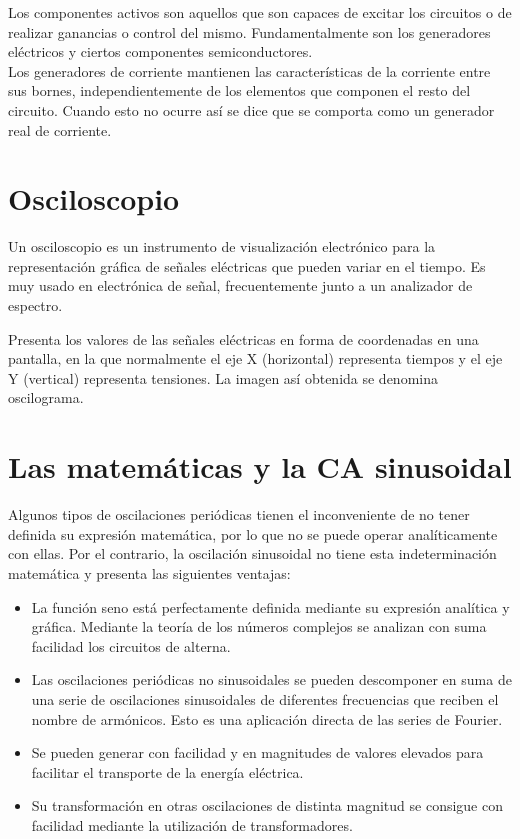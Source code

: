 \documentclass{article}
\begin{document}
  Los componentes activos son aquellos que son capaces de excitar los circuitos o de realizar ganancias o control del mismo. Fundamentalmente son los generadores eléctricos y ciertos componentes semiconductores.\citep{EAP}\\
  
    Los generadores de corriente mantienen las características de la corriente entre sus bornes, independientemente de los elementos que componen el resto del circuito. Cuando esto no ocurre así se dice que se comporta como un generador real de corriente.\citep{EAP}\\

\section{Osciloscopio}

Un osciloscopio es un instrumento de visualización electrónico para la representación gráfica de señales eléctricas que pueden variar en el tiempo. Es muy usado en electrónica de señal, frecuentemente junto a un analizador de espectro.\citep{Osc}

Presenta los valores de las señales eléctricas en forma de coordenadas en una pantalla, en la que normalmente el eje X (horizontal) representa tiempos y el eje Y (vertical) representa tensiones. La imagen así obtenida se denomina oscilograma.\citep{Osc} 

\section{Las matemáticas y la CA sinusoidal}

Algunos tipos de oscilaciones periódicas tienen el inconveniente de no tener definida su expresión matemática, por lo que no se puede operar analíticamente con ellas. Por el contrario, la oscilación sinusoidal no tiene esta indeterminación matemática y presenta las siguientes ventajas:\citep{CA}\\

\begin{itemize}
    \item La función seno está perfectamente definida mediante su expresión analítica y gráfica. Mediante la teoría de los números complejos se analizan con suma facilidad los circuitos de alterna.
    
    \item Las oscilaciones periódicas no sinusoidales se pueden descomponer en suma de una serie de oscilaciones sinusoidales de diferentes frecuencias que reciben el nombre de armónicos. Esto es una aplicación directa de las series de Fourier.
    
    \item Se pueden generar con facilidad y en magnitudes de valores elevados para facilitar el transporte de la energía eléctrica.
    
    \item Su transformación en otras oscilaciones de distinta magnitud se consigue con facilidad mediante la utilización de transformadores.
    
\end{itemize}
\end{document}
